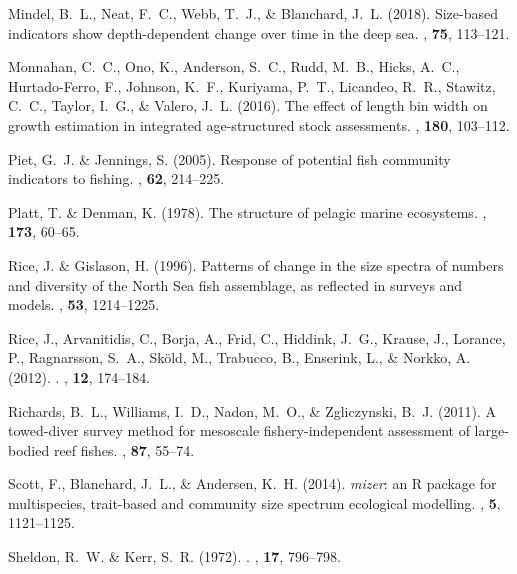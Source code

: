 \documentclass[12pt, letter]{article}
\begin{document}
\begin{thebibliography}{}
Mindel, B.~L., Neat, F.~C., Webb, T.~J., \& Blanchard, J.~L. (2018).
\newblock Size-based indicators show depth-dependent change over time in the
  deep sea.
, {\bf 75}, 113--121.

Monnahan, C.~C., Ono, K., Anderson, S.~C., Rudd, M.~B., Hicks, A.~C.,
  Hurtado-Ferro, F., Johnson, K.~F., Kuriyama, P.~T., Licandeo, R.~R., Stawitz,
  C.~C., Taylor, I.~G., \& Valero, J.~L. (2016).
\newblock The effect of length bin width on growth estimation in integrated
  age-structured stock assessments.
, {\bf 180}, 103--112.

Piet, G.~J. \& Jennings, S. (2005).
\newblock Response of potential fish community indicators to fishing.
, {\bf 62}, 214--225.

Platt, T. \& Denman, K. (1978).
\newblock The structure of pelagic marine ecosystems.
, {\bf 173},
  60--65.

Rice, J. \& Gislason, H. (1996).
\newblock Patterns of change in the size spectra of numbers and diversity of
  the {N}orth {S}ea fish assemblage, as reflected in surveys and models.
, {\bf 53}, 1214--1225.

Rice, J., Arvanitidis, C., Borja, A., Frid, C., Hiddink, J.~G., Krause, J.,
  Lorance, P., Ragnarsson, S.~A., Sk\"old, M., Trabucco, B., Enserink, L., \&
  Norkko, A. (2012).
.
, {\bf 12}, 174--184.

Richards, B.~L., Williams, I.~D., Nadon, M.~O., \& Zgliczynski, B.~J. (2011).
\newblock A towed-diver survey method for mesoscale fishery-independent
  assessment of large-bodied reef fishes.
, {\bf 87}, 55--74.

Scott, F., Blanchard, J.~L., \& Andersen, K.~H. (2014).
\newblock \emph{mizer}: an {R} package for multispecies, trait-based and
  community size spectrum ecological modelling.
, {\bf 5}, 1121--1125.

Sheldon, R.~W. \& Kerr, S.~R. (1972).
.
, {\bf 17}, 796--798.


\end{thebibliography}
\end{document}
